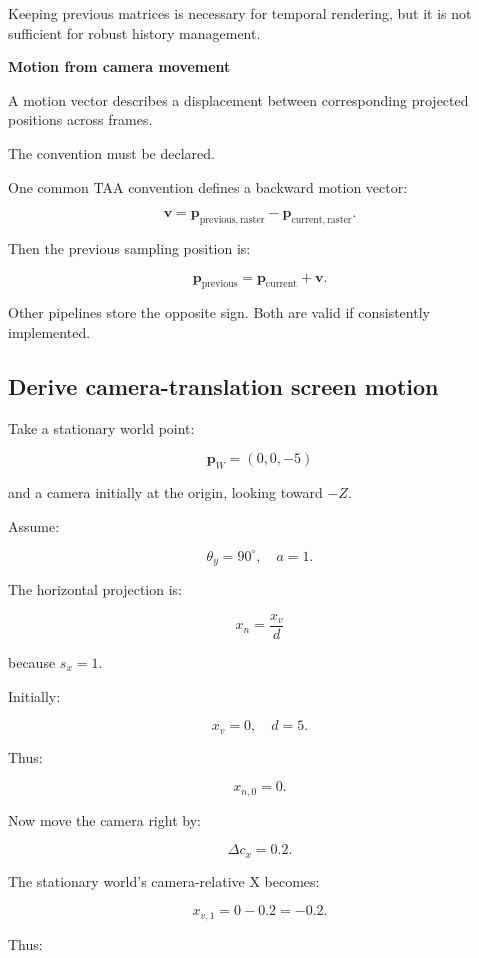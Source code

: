 Keeping previous matrices is necessary for temporal rendering, but it is not sufficient for robust history management.

\textbf{Motion from camera movement}

A motion vector describes a displacement between corresponding projected positions across frames.

The convention must be declared.

One common TAA convention defines a backward motion vector:

\[
 \boxed{ \mathbf v= \mathbf p_{\mathrm{previous,raster}} - \mathbf p_{\mathrm{current,raster}} }.
\]

Then the previous sampling position is:

\[
 \boxed{ \mathbf p_{\mathrm{previous}} = \mathbf p_{\mathrm{current}}+\mathbf v }.
\]

Other pipelines store the opposite sign. Both are valid if consistently implemented.

\subsection{Derive camera-translation screen motion}\label{02-foundations-ii-ch036-derive-camera-translation-screen-motion}

\hypertarget{02-foundations-ii-ch036-derive-camera-translation-screen-motion}{}

Take a stationary world point:

\[
 \mathbf p_W=(0,0,-5)
\]

and a camera initially at the origin, looking toward \(-Z\).

Assume:

\[
 \theta_y=90^\circ,\quad a=1.
\]

The horizontal projection is:

\[
 x_n=\frac{x_v}{d}
\]

because \(s_x=1\).

Initially:

\[
 x_v=0,\quad d=5.
\]

Thus:

\[
 x_{n,0}=0.
\]

Now move the camera right by:

\[
 \Delta c_x=0.2.
\]

The stationary world's camera-relative X becomes:

\[
 x_{v,1}=0-0.2=-0.2.
\]

Thus:

